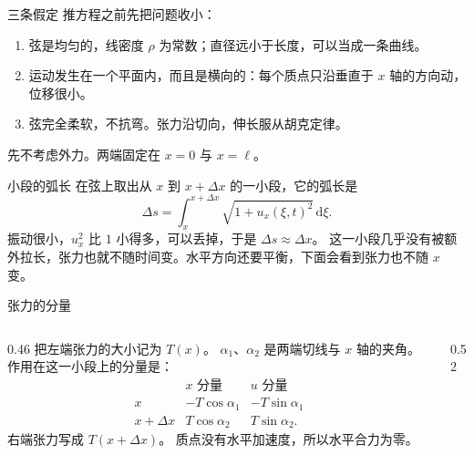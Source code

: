 \documentclass[fontset=windows, chinese, 10pt, xcolor=dvipsnames]{beamer}
\begin{document}
\begin{frame}{三条假定}
  推方程之前先把问题收小：
  \begin{enumerate}
    \item 弦是均匀的，线密度 $\rho$ 为常数；直径远小于长度，可以当成一条曲线。
    \item 运动发生在一个平面内，而且是横向的：每个质点只沿垂直于 $x$ 轴的方向动，位移很小。
    \item 弦完全柔软，不抗弯。张力沿切向，伸长服从胡克定律。
  \end{enumerate}
  先不考虑外力。两端固定在 $x=0$ 与 $x=\ell$。
\end{frame}

\begin{frame}{小段的弧长}
  在弦上取出从 $x$ 到 $x+\Delta x$ 的一小段，它的弧长是
  \begin{equation*}
    \Delta s=\int_x^{x+\Delta x}\sqrt{1+u_x(\xi,t)^2}\,\mathrm{d}\xi.
  \end{equation*}
  振动很小，$u_x^2$ 比 $1$ 小得多，可以丢掉，于是 $\Delta s\approx\Delta x$。
  \vspace{0.35em}
  这一小段几乎没有被额外拉长，张力也就不随时间变。水平方向还要平衡，下面会看到张力也不随 $x$ 变。
\end{frame}

\begin{frame}{张力的分量}
  \begin{columns}[T]
    \begin{column}{0.46\textwidth}
      \footnotesize
      把左端张力的大小记为 $T(x)$。
      $\alpha_1$、$\alpha_2$ 是两端切线与 $x$ 轴的夹角。
      作用在这一小段上的分量是：
      \begin{equation*}
        \begin{array}{c|cc}
          & x\text{ 分量} & u\text{ 分量}\\ \hline
          x & -T\cos\alpha_1 & -T\sin\alpha_1\\
          x+\Delta x & T\cos\alpha_2 & T\sin\alpha_2.
        \end{array}
      \end{equation*}
      右端张力写成 $T(x+\Delta x)$。
      质点没有水平加速度，所以水平合力为零。
    \end{column}
    \begin{column}{0.52\textwidth}
      \centering
      \vspace{0.2em}
      \scalebox{0.95}{}
    \end{column}
  \end{columns}
\end{frame}
\end{document}
